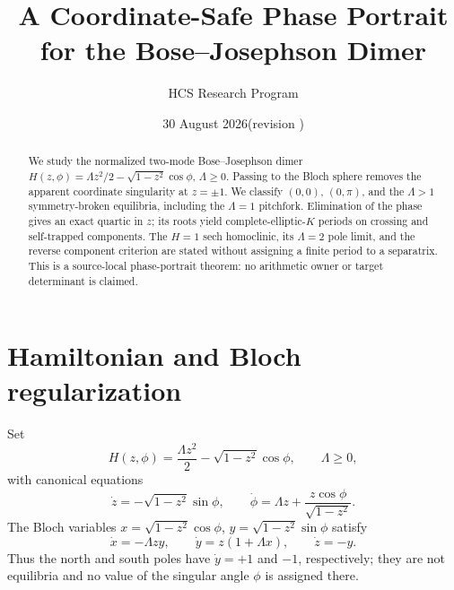 \documentclass[10pt]{article}
\title{A Coordinate-Safe Phase Portrait for the Bose--Josephson Dimer}
\author{HCS Research Program}
\date{30 August 2026\quad (revision \CRevisionRound)}
\begin{document}
\maketitle
\begin{abstract}
We study the normalized two-mode Bose--Josephson dimer
\(H(z,\phi)=\Lambda z^2/2-\sqrt{1-z^2}\cos\phi\), \(\Lambda\ge0\).
Passing to the Bloch sphere removes the apparent coordinate singularity at
\(z=\pm1\).  We classify \((0,0)\), \((0,\pi)\), and the
\(\Lambda>1\) symmetry-broken equilibria, including the \(\Lambda=1\)
pitchfork.  Elimination of the phase gives an exact quartic in \(z\); its
roots yield complete-elliptic-\(K\) periods on crossing and self-trapped
components.  The \(H=1\) sech homoclinic, its \(\Lambda=2\) pole limit, and
the reverse component criterion are stated without assigning a finite period
to a separatrix.  This is a source-local phase-portrait theorem: no arithmetic
owner or target determinant is claimed.
\end{abstract}

\section{Hamiltonian and Bloch regularization}
Set
\[
 H(z,\phi)=\frac{\Lambda z^2}{2}-\sqrt{1-z^2}\cos\phi,
 \qquad \Lambda\ge0,
\]
with canonical equations
\[
 \dot z=-\sqrt{1-z^2}\sin\phi,\qquad
 \dot\phi=\Lambda z+\frac{z\cos\phi}{\sqrt{1-z^2}}. \tag{1}
\]
The Bloch variables
\(x=\sqrt{1-z^2}\cos\phi\), \(y=\sqrt{1-z^2}\sin\phi\) satisfy
\[
 \dot x=-\Lambda zy,\qquad \dot y=z(1+\Lambda x),\qquad \dot z=-y. \tag{2}
\]
Thus the north and south poles have \(\dot y=+1\) and \(-1\), respectively;
they are not equilibria and no value of the singular angle \(\phi\) is
assigned there.
\end{document}
